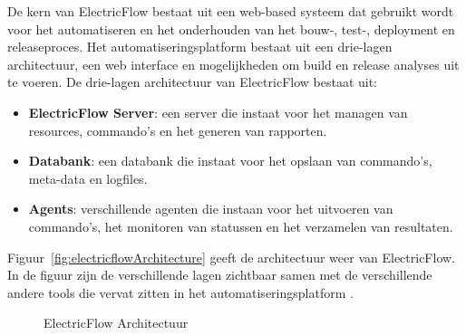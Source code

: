 De kern van ElectricFlow bestaat uit een web-based systeem dat gebruikt wordt voor het automatiseren en het onderhouden van het bouw-, test-, deployment en releaseproces.
Het automatiseringsplatform bestaat uit een drie-lagen architectuur, een web interface en mogelijkheden om build en release analyses uit te voeren.
De drie-lagen architectuur van ElectricFlow bestaat uit:
\begin{itemize}
\item \textbf{ElectricFlow Server}: een server die instaat voor het managen van resources, commando's en het generen van rapporten.
\item \textbf{Databank}: een databank die instaat voor het opslaan van commando's, meta-data en logfiles.
\item \textbf{Agents}: verschillende agenten die instaan voor het uitvoeren van commando's, het monitoren van statussen en het verzamelen van resultaten.
\end{itemize}
Figuur~\vref{fig:electricflowArchitecture} geeft de architectuur weer van ElectricFlow.
In de figuur zijn de verschillende lagen zichtbaar samen met de verschillende andere tools die vervat zitten in het automatiseringsplatform \citep{electricflow}.

\begin{figure}[!ht]
\centering
{}
\caption{ElectricFlow Architectuur \citep{electricflow}}
\label{fig:electricflowArchitecture}
\end{figure}

